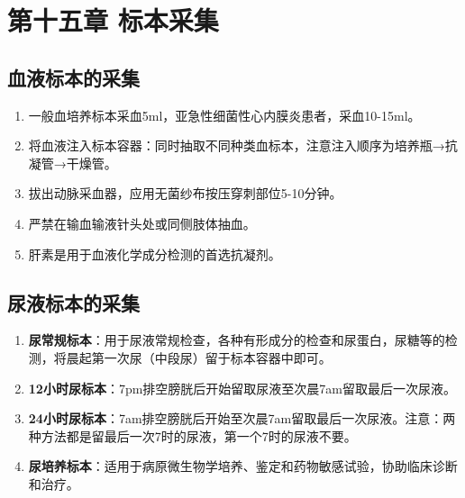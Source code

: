 \documentclass[11pt, a4paper]{ctexart}
\begin{document}
\section{第十五章 标本采集}
\subsection{血液标本的采集}
\begin{enumerate}
	\item 一般血培养标本采血5ml，亚急性细菌性心内膜炎患者，采血10-15ml。
	\item 将血液注入标本容器：同时抽取不同种类血标本，注意注入顺序为培养瓶→抗凝管→干燥管。
	\item 拔出动脉采血器，应用无菌纱布按压穿刺部位5-10分钟。
	\item 严禁在输血输液针头处或同侧肢体抽血。
	\item 肝素是用于血液化学成分检测的首选抗凝剂。
\end{enumerate}

\subsection{尿液标本的采集}
\begin{enumerate}
	\item \textbf{尿常规标本}：用于尿液常规检查，各种有形成分的检查和尿蛋白，尿糖等的检测，将晨起第一次尿（中段尿）留于标本容器中即可。
	\item \textbf{12小时尿标本}：7pm排空膀胱后开始留取尿液至次晨7am留取最后一次尿液。
	\item \textbf{24小时尿标本}：7am排空膀胱后开始至次晨7am留取最后一次尿液。注意：两种方法都是留最后一次7时的尿液，第一个7时的尿液不要。
	\item \textbf{尿培养标本}：适用于病原微生物学培养、鉴定和药物敏感试验，协助临床诊断和治疗。
\end{enumerate}
\end{document}
